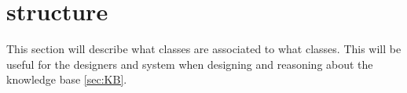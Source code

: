 \section{structure}\label{sec:structure}

This section will describe what classes are associated to what classes. This will be useful for the designers and system when designing and reasoning about the knowledge base \cref{sec:KB}.


